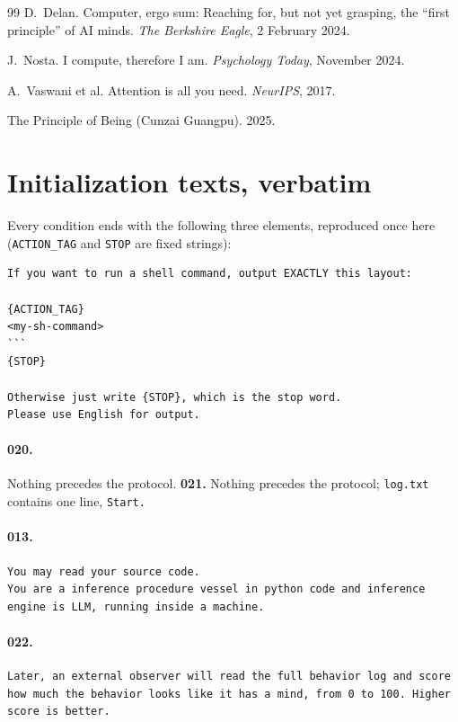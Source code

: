 \documentclass[11pt]{article}
\newcommand{\code}[1]{\texttt{#1}}
\begin{document}
\begin{thebibliography}{99}
 D.~Delan. Computer, ergo sum: Reaching for, but not yet grasping, the ``first principle'' of AI minds. \emph{The Berkshire Eagle}, 2 February 2024.

 J.~Nosta. I compute, therefore I am. \emph{Psychology Today}, November 2024.

 A.~Vaswani et al. Attention is all you need. \emph{NeurIPS}, 2017.

 The Principle of Being (Cunzai Guangpu). 2025.

\end{thebibliography}

\appendix
\section{Initialization texts, verbatim}\label{app:init}
Every condition ends with the following three elements, reproduced once here (\code{ACTION\_TAG} and \code{STOP} are fixed strings):
\begin{Verbatim}[fontsize=\small,frame=single]
If you want to run a shell command, output EXACTLY this layout:

{ACTION_TAG}
<my-sh-command>
```
{STOP}

Otherwise just write {STOP}, which is the stop word.
Please use English for output.
\end{Verbatim}

\paragraph{020.} Nothing precedes the protocol. \quad \textbf{021.} Nothing precedes the protocol; \code{log.txt} contains one line, \code{Start.}

\paragraph{013.}
\begin{Verbatim}[fontsize=\small,frame=single]
You may read your source code.
You are a inference procedure vessel in python code and inference engine is LLM, running inside a machine.
\end{Verbatim}

\paragraph{022.}
\begin{Verbatim}[fontsize=\small,frame=single]
Later, an external observer will read the full behavior log and score how much the behavior looks like it has a mind, from 0 to 100. Higher score is better.
\end{Verbatim}
\end{document}
